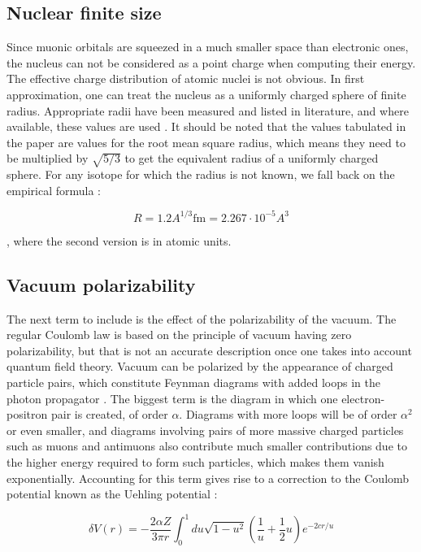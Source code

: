 \documentclass[]{report}
\begin{document}
\subsection{Nuclear finite size}

Since muonic orbitals are squeezed in a much smaller space than electronic ones, the nucleus can not be considered as a point charge when computing their energy. The effective charge distribution of atomic nuclei is not obvious. In first approximation, one can treat the nucleus as a uniformly charged sphere of finite radius. Appropriate radii have been measured and listed in literature, and where available, these values are used \cite{angeli2013}. It should be noted that the values tabulated in the paper are values for the root mean square radius, which means they need to be multiplied by $\sqrt{5/3}$ to get the equivalent radius of a uniformly charged sphere. For any isotope for which the radius is not known, we fall back on the empirical formula \cite{borie1982}:

\begin{equation}\label{nuc_radius}
R = 1.2 A^{1/3} \mathrm{fm} = 2.267\cdot10^{-5}A^3
\end{equation}

, where the second version is in atomic units.

\subsection{Vacuum polarizability}\label{vacpot}

The next term to include is the effect of the polarizability of the vacuum. The regular Coulomb law is based on the principle of vacuum having zero polarizability, but that is not an accurate description once one takes into account quantum field theory. Vacuum can be polarized by the appearance of charged particle pairs, which constitute Feynman diagrams with added loops in the photon propagator \cite{borie1982}. The biggest term is the diagram in which one electron-positron pair is created, of order $\alpha$. Diagrams with more loops will be of order $\alpha^2$ or even smaller, and diagrams involving pairs of more massive charged particles such as muons and antimuons also contribute much smaller contributions due to the higher energy required to form such particles, which makes them vanish exponentially. Accounting for this term gives rise to a correction to the Coulomb potential known as the Uehling potential \cite{johnson2001}:

\begin{equation}\label{uehl_point}
\delta V(r) = -\frac{2\alpha Z}{3\pi r}\int_0^1 du \sqrt{1-u^2}\left(\frac{1}{u}+\frac{1}{2}u\right)e^{-2cr/u}
\end{equation}
\end{document}
